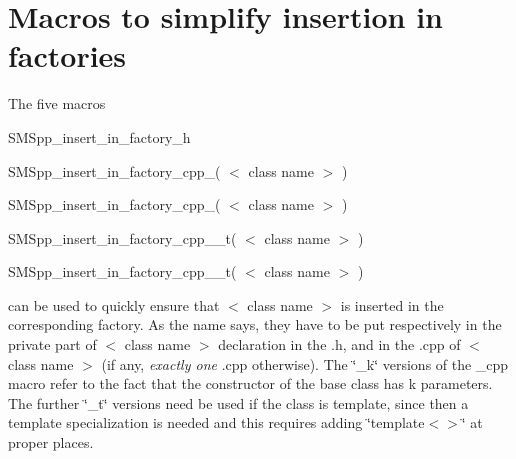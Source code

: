 \hypertarget{group__macro__for__factories}{}\section{Macros to simplify insertion in factories}
\label{group__macro__for__factories}
The five macros

S\+M\+Spp\+\_\+insert\+\_\+in\+\_\+factory\+\_\+h

S\+M\+Spp\+\_\+insert\+\_\+in\+\_\+factory\+\_\+cpp\+\_( $<$ class name $>$ )

S\+M\+Spp\+\_\+insert\+\_\+in\+\_\+factory\+\_\+cpp\+\_( $<$ class name $>$ )

S\+M\+Spp\+\_\+insert\+\_\+in\+\_\+factory\+\_\+cpp\+\_\+\_\+t( $<$ class name $>$ )

S\+M\+Spp\+\_\+insert\+\_\+in\+\_\+factory\+\_\+cpp\+\_\+\_\+t( $<$ class name $>$ )

can be used to quickly ensure that $<$ class name $>$ is inserted in the corresponding factory. As the name says, they have to be put respectively in the private part of $<$ class name $>$ declaration in the .h, and in the .cpp of $<$ class name $>$ (if any, {\itshape exactly one} .cpp otherwise). The \char`\"{}\+\_\+k\char`\"{} versions of the \+\_\+cpp macro refer to the fact that the constructor of the base class has k parameters. The further \char`\"{}\+\_\+t\char`\"{} versions need be used if the class is template, since then a template specialization is needed and this requires adding \char`\"{}template$<$$>$\char`\"{} at proper places. 